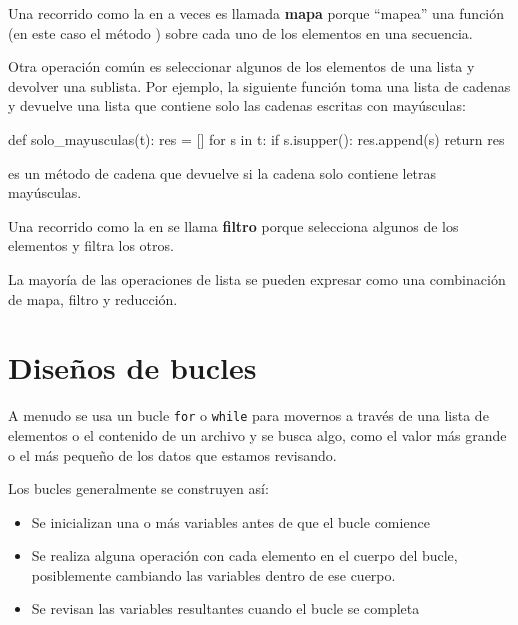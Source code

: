 Una recorrido como la en  a veces es llamada \textbf{
mapa} porque ``mapea'' una función (en este caso el método ) sobre cada uno de los elementos en una secuencia.

Otra operación común es seleccionar algunos de los elementos de
una lista y devolver una sublista.  Por ejemplo, la siguiente
función toma una lista de cadenas y devuelve una lista que contiene
solo las cadenas escritas con mayúsculas:

\begin{python}[frame=single]
def solo_mayusculas(t):
    res = []
    for s in t:
        if s.isupper():
            res.append(s)
    return res
\end{python}
%
 es un método de cadena que devuelve  si
la cadena solo contiene letras mayúsculas.

Una recorrido como la en  se llama \textbf{filtro} porque
selecciona algunos de los elementos y filtra los otros.

La mayoría de las operaciones de lista se pueden expresar como una combinación
de mapa, filtro y reducción.





\hypertarget{diseuxf1os-de-bucles}{%
\section{Diseños de bucles}\label{diseuxf1os-de-bucles}}

A menudo se usa un bucle \texttt{for} o \texttt{while} para movernos a
través de una lista de elementos o el contenido de un archivo y se busca
algo, como el valor más grande o el más pequeño de los datos que estamos
revisando.

Los bucles generalmente se construyen así:

\begin{itemize}[nosep]
\item
  Se inicializan una o más variables antes de que el bucle comience
\item
  Se realiza alguna operación con cada elemento en el cuerpo del bucle,
  posiblemente cambiando las variables dentro de ese cuerpo.
\item
  Se revisan las variables resultantes cuando el bucle se completa
\end{itemize}

